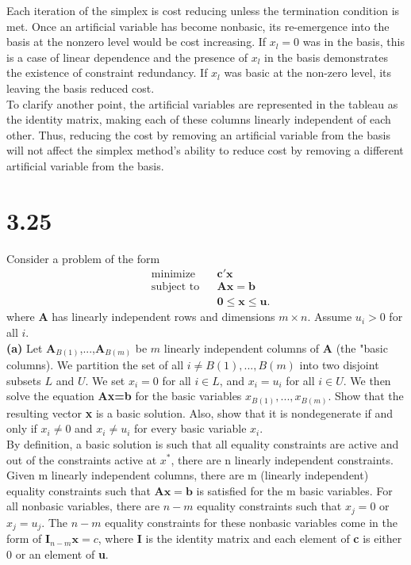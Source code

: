 \documentclass{article}
\begin{document}
\noindent
Each iteration of the simplex is cost reducing unless the termination condition is met.  Once an artificial variable has become nonbasic, its re-emergence into the basis at the nonzero level would be cost increasing.  If $x_l = 0$ was in the basis, this is a case of linear dependence and the presence of $x_l$ in the basis demonstrates the existence of constraint redundancy.  If $x_l$ was basic at the non-zero level, its leaving the basis reduced cost.\\

\noindent
To clarify another point, the artificial variables are represented in the tableau as the identity matrix, making each of these columns linearly independent of each other.  Thus, reducing the cost by removing an artificial variable from the basis will not affect the simplex method's ability to reduce cost by removing a different artificial variable from the basis.\\

\section*{3.25}
Consider a problem of the form
\begin{equation*}
\begin{aligned}
& \text{minimize} && \mathbf{c'x} \\
& \text{subject to} && \mathbf{Ax=b} \\
& 			&&		\mathbf{0 \leq x \leq u}. 
\end{aligned}
\end{equation*}
where \textbf{A} has linearly independent rows and dimensions $m \times n$.  Assume $u_i > 0$ for all $i.$\\

\noindent
\textbf{(a)}
Let $\mathbf{A}_{B(1)}$,...,$\mathbf{A}_{B(m)}$ be $m$ linearly independent columns of \textbf{A} (the "basic columns).  We partition the set of all $i \neq B(1),...,B(m)$ into two disjoint subsets $L$ and $U$.  We set $x_i=0$ for all $i \in L$, and $x_i=u_i$ for all $i \in U$.  We then solve the equation \textbf{Ax=b} for the basic variables $x_{B(1)},...,x_{B(m)}$.  Show that the resulting vector \textbf{x} is a basic solution.  Also, show that it is nondegenerate if and only if $x_i \neq 0$ and $x_i \neq u_i$ for every basic variable $x_i$.  \\

\noindent
By definition, a basic solution is such that all equality constraints are active and out of the constraints active at $x^*$, there are n linearly independent constraints.
Given m linearly independent columns, there are m (linearly independent) equality constraints such that $\mathbf{Ax=b}$ is satisfied for the m basic variables.  For all nonbasic variables, there are $n-m$ equality constraints such that $x_j = 0$ or $x_j = u_j$.  The $n-m$ equality constraints for these nonbasic variables come in the form of $\mathbf{I}_{n-m} \mathbf{x} = c$, where \textbf{I} is the identity matrix and each element of \textbf{c} is either 0 or an element of \textbf{u}.  \\
\end{document}

